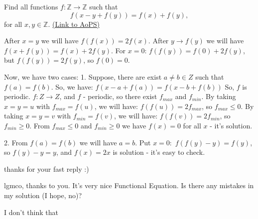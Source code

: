 \begin{problem}
	Find all functions $ f: \mathbb Z\to \mathbb Z$ such that
\[ f(x-y+f(y))=f(x)+f(y),\] for all $x, y \in \mathbb Z$.
	\flushright \href{https://artofproblemsolving.com/community/c6h298172}{(Link to AoPS)}
\end{problem}



\begin{solution}
	After $ x = y$ we will have $ f(f(x)) = 2f(x)$.
After $ y\rightarrow f(y)$ we will have $ f(x + f(y)) = f(x) + 2f(y)$.
For $ x = 0$: $ f(f(y)) = f(0) + 2f(y)$, but $ f(f(y)) = 2f(y)$, so $ f(0) = 0$.

Now, we have two cases:
1. Suppose, there are exist $ a\neq b\in Z$ such that $ f(a) = f(b)$. So, we have:
$ f(x - a + f(a)) = f(x - b + f(b))$
So, $ f$ is periodic. $ f: Z\rightarrow Z$, and $ f$ - periodic, so there exist $ f_{max}$ and $ f_{min}$.
By taking $ x = y = u$ with $ f_{max} = f(u)$, we will have:
$ f(f(u)) = 2f_{max}$, so $ f_{max}\leq 0$.
By taking $ x = y = v$ with $ f_{min} = f(v)$, we will have:
$ f(f(v)) = 2f_{min}$, so $ f_{min}\geq 0$.
From $ f_{max}\leq 0$ and $ f_{min}\geq 0$ we have $ f(x) = 0$ for all $ x$ - it's solution.

2. From $ f(a) = f(b)$ we will have $ a = b$.
Put $ x = 0:$ $ f(f(y) - y) = f(y)$, so $ f(y) - y = y$, and $ f(x) = 2x$ is solution - it's easy to check.
\end{solution}



\begin{solution}
	thanks for your fast reply  :)
\end{solution}



\begin{solution}
	lgmco, thanks to you. It's very nice Functional Equation.
Is there any mistakes in my solution (I hope, no)?
\end{solution}



\begin{solution}
	I don't think that  
\end{solution}




